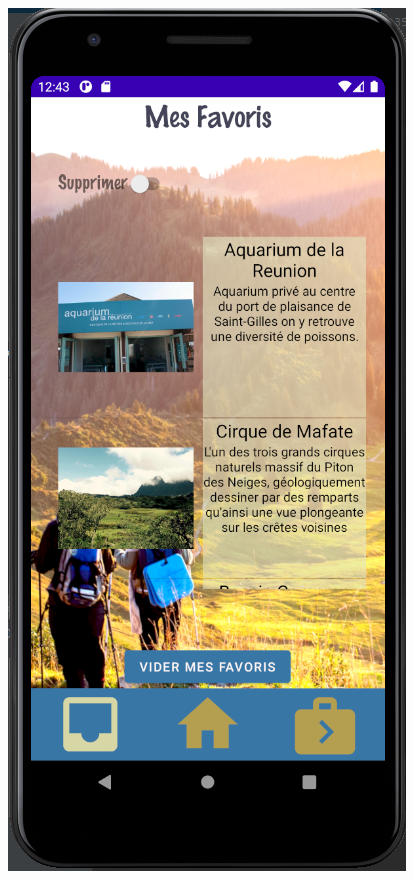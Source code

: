 \documentclass{article}
\begin{document}
\hfill
\begin{minipage}{0.2\textwidth}
\includegraphics[width=\textwidth]{Mes_favoris}
\end{minipage}
\end{document}
